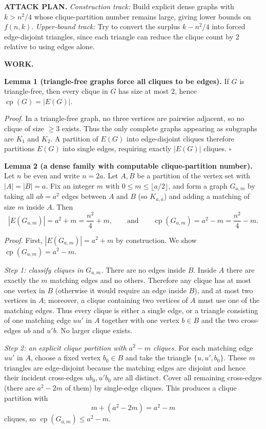 \medskip
\noindent\textbf{ATTACK PLAN.}
\emph{Construction track:} Build explicit dense graphs with $k>n^2/4$ whose clique-partition number remains large, giving lower bounds on $f(n,k)$.
\emph{Upper-bound track:} Try to convert the surplus $k-n^2/4$ into forced edge-disjoint triangles, since each triangle can reduce the clique count by $2$ relative to using edges alone.

\medskip
\noindent\textbf{WORK.}

\noindent\textbf{Lemma 1 (triangle-free graphs force all cliques to be edges).}
If $G$ is triangle-free, then every clique in $G$ has size at most $2$, hence $\operatorname{cp}(G)=|E(G)|$.

\textit{Proof.}
In a triangle-free graph, no three vertices are pairwise adjacent, so no clique of size $\ge 3$ exists.
Thus the only complete graphs appearing as subgraphs are $K_1$ and $K_2$.
A partition of $E(G)$ into edge-disjoint cliques therefore partitions $E(G)$ into single edges, requiring exactly $|E(G)|$ cliques.
\hfill$\square$

\medskip
\noindent\textbf{Lemma 2 (a dense family with computable clique-partition number).}
Let $n$ be even and write $n=2a$.
Let $A,B$ be a partition of the vertex set with $|A|=|B|=a$.
Fix an integer $m$ with $0\le m\le \lfloor a/2\rfloor$, and form a graph $G_{a,m}$ by taking all $ab=a^2$ edges between $A$ and $B$ (so $K_{a,a}$) and adding a matching of size $m$ inside $A$.
Then
\[
|E(G_{a,m})| = a^2+m = \frac{n^2}{4}+m,
\qquad\text{and}\qquad
\operatorname{cp}(G_{a,m}) = a^2-m = \frac{n^2}{4}-m.
\]

\textit{Proof.}
First, $|E(G_{a,m})|=a^2+m$ by construction.
We show $\operatorname{cp}(G_{a,m})=a^2-m$.

\emph{Step 1: classify cliques in $G_{a,m}$.}
There are no edges inside $B$.
Inside $A$ there are exactly the $m$ matching edges and no others.
Therefore any clique has at most one vertex in $B$ (otherwise it would require an edge inside $B$), and at most two vertices in $A$; moreover, a clique containing two vertices of $A$ must use one of the matching edges.
Thus every clique is either a single edge, or a triangle consisting of one matching edge $uu'$ in $A$ together with one vertex $b\in B$ and the two cross-edges $ub$ and $u'b$.
No larger clique exists.

\emph{Step 2: an explicit clique partition with $a^2-m$ cliques.}
For each matching edge $uu'$ in $A$, choose a fixed vertex $b_0\in B$ and take the triangle $\{u,u',b_0\}$.
These $m$ triangles are edge-disjoint because the matching edges are disjoint and hence their incident cross-edges $ub_0,u'b_0$ are all distinct.
Cover all remaining cross-edges (there are $a^2-2m$ of them) by single-edge cliques.
This produces a clique partition with
\[
m + (a^2-2m)=a^2-m\]
cliques, so $\operatorname{cp}(G_{a,m})\le a^2-m$.


